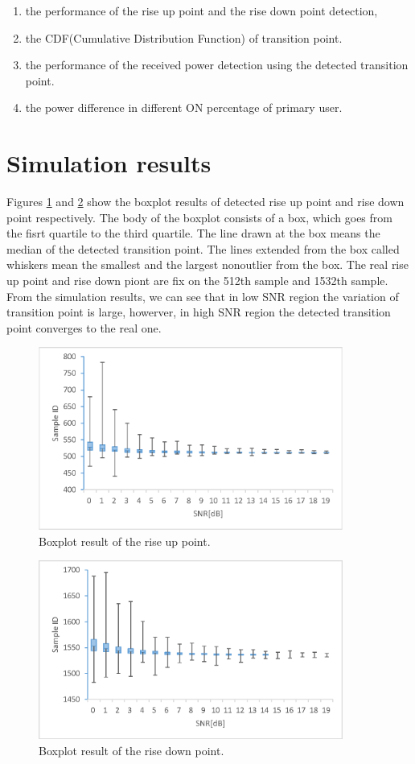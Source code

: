 \begin{enumerate}
\item the performance of the rise up point and the rise down point detection, 
\item the CDF(Cumulative Distribution Function) of transition point.
\item the performance of the received power detection using the detected transition point.
\item the power difference in different ON percentage of primary user.
\end{enumerate}

\section{Simulation results}
Figures \ref{transition_up} and \ref{transition_down} show the boxplot results of detected rise up point and rise down point respectively. The body of the boxplot consists of a box, which goes from the fisrt quartile to the third quartile. The line drawn at the box means the median of the detected transition point. The lines extended from the box called whiskers mean the smallest and the largest nonoutlier from the box. The real rise up point and rise down piont are fix on the 512th sample and 1532th sample. From the simulation results, we can see that in low SNR region the variation of transition point is large, howerver, in high SNR region the detected transition point converges to the real one.

\newpage

\begin{figure}[!htp]
\centering
\includegraphics[width=100mm]{transition_up.eps}
\caption{Boxplot result of the rise up point.}
\label{transition_up}
\end{figure}
\begin{figure}[!htp]
\centering
\includegraphics[width=100mm]{transition_down.eps}
\caption{Boxplot result of the rise down point.}
\label{transition_down}
\end{figure}

